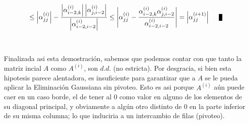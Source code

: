 \begin{equation}
\leq \left | \alpha_{jj}^{(i)} \right | - \frac{\left | \alpha_{i-2,k}^{(i)} \right | \left |\alpha_{j,i-2}^{(i)} \right | }{ \left | \alpha_{i-2,i-2}^{(i)} \right | } \leq \left | \alpha_{jj}^{(i)} - \frac{\alpha_{i-2,k}^{(i)}\alpha_{j,i-2}^{(i)}}{\alpha_{i-2,i-2}^{(i)}} \right | = \left | \alpha_{jj}^{(i+1)} \right | \qed
\end{equation}
\\
\\
Finalizada asi esta demostraci\'on, sabemos que podemos contar con que tanto la matriz incial $A$ como $A^{(i)}$, son $d.d.$ (no estricta). Por desgracia, si bien esta hipotesis parece alentadora, es insuficiente para garantizar que a $A$ se le pueda aplicar la Eliminaci\'on Gaussiana sin pivoteo. Esto es asi porque $A^{(i)}$ a\'un puede caer en un caso borde, el de tener al $0$ como valor en alguno de los elementos de su diagonal principal, y obviamente a alg\'un otro distinto de $0$ en la parte inferior de su misma columna; lo que induciria a un intercambio de filas (pivoteo).

